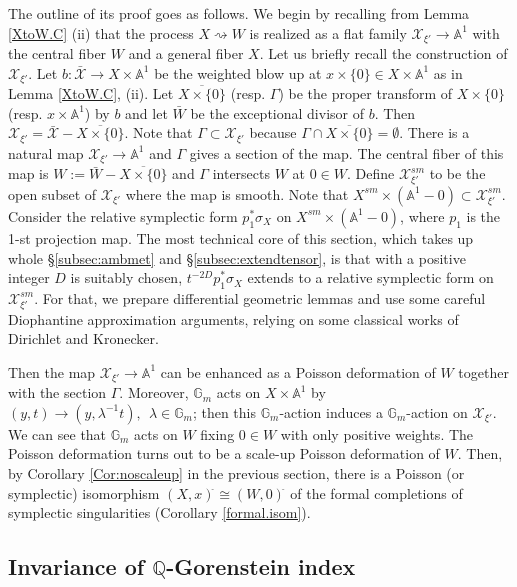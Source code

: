 \documentclass[12pt,a4paper]{amsart}
\theoremstyle{remark}
\theoremstyle{definition}
\def\G{\mathbb{G}}
\def\Q{\mathbb{Q}}
\def\A{\mathbb{A}}
\begin{document}
The outline of its proof goes as follows. 
We begin by recalling from Lemma \ref{XtoW.C} (ii) that the process $X\rightsquigarrow W$ is realized as a 
flat family $\mathcal{X}_{\xi'} \to \A^1$ with 
the central fiber $W$ and a general fiber $X$. 
Let us briefly recall the construction of $\mathcal{X}_{\xi'}$. Let $b: \bar{\mathcal{X}} \to X \times \A^1$ be the weighted blow up 
at $x \times \{0\} \in X \times \A^1$ as in 
Lemma \ref{XtoW.C}, (ii). Let $\overline{X \times \{0\}}$ (resp. $\Gamma$) be the proper transform of $X \times \{0\}$ (resp. $x \times \A^1$) by $b$ and let $\bar{W}$ 
be the exceptional divisor of $b$. Then 
$\mathcal{X}_{\xi'} = \bar{\mathcal{X}} - 
\overline{X \times \{0\}}$.  Note that $\Gamma 
\subset \mathcal{X}_{\xi'}$ because  $\Gamma \cap \overline{X \times \{0\}} = \emptyset$. 
There is a natural map $\mathcal{X}_{\xi'} \to \A^1$ and $\Gamma$ gives a section of the map. The central fiber of this map is $W := \bar{W} - \overline{X \times \{0\}}$ and $\Gamma$ intersects $W$ at $0 \in W$.   
Define $\mathcal{X}^{sm}_{\xi'}$ to be the 
open subset of $\mathcal{X}_{\xi'}$ where the 
map is smooth. Note that $X^{sm} \times (\A^1 - 0) \subset \mathcal{X}^{sm}_{\xi'}$. 
Consider the relative symplectic form $p_1^*\sigma_X$ on $X^{sm} \times (\A^1 - 0)$, where $p_1$ is the 1-st projection map. 
The most technical core of this section, which takes up whole 
\S \ref{subsec:ambmet} and \S \ref{subsec:extendtensor}, is that 
with a positive integer $D$ is suitably chosen, 
$t^{-2D}p_1^*\sigma_X$ extends to a relative symplectic form on 
$\mathcal{X}^{sm}_{\xi'}$. For that, we prepare differential geometric 
lemmas and use some careful Diophantine approximation arguments, 
relying on some classical works of Dirichlet and Kronecker. 

Then the map $\mathcal{X}_{\xi'} \to 
\A^1$ can be enhanced as a Poisson deformation of $W$ together with the section $\Gamma$. Moreover, $\G_m$ acts on $X \times \A^1$ by $(y,t) \to (y, \lambda^{-1}t), \:\: \lambda \in \G_m$; then this $\G_m$-action induces a $\G_m$-action on $\mathcal{X}_{\xi'}$. We can see that 
$\G_m$ acts on $W$ fixing $0 \in W$ with only 
positive weights. The Poisson deformation turns out to be a scale-up Poisson deformation of $W$. Then, by 
Corollary \ref{Cor:noscaleup} in the previous section, 
there is a Poisson (or symplectic) isomorphism $(X, x)^{\hat{}}  \cong  (W, 0)^{\hat{}}$ of the formal completions of  symplectic singularities (Corollary \ref{formal.isom}). 

\subsection{Invariance of $\Q$-Gorenstein index} 
\end{document}
